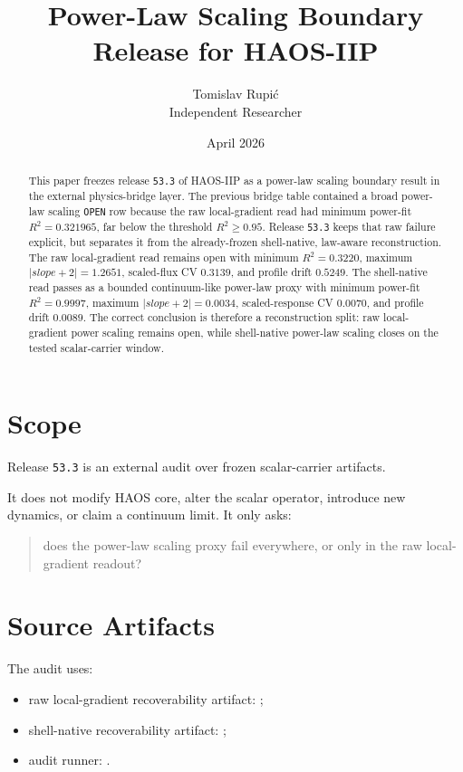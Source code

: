 \documentclass[11pt]{article}
\title{Power-Law Scaling Boundary Release for HAOS-IIP}
\author{Tomislav Rupi\'c \\ Independent Researcher}
\date{April 2026}
\begin{document}
\maketitle

\begin{abstract}
This paper freezes release \texttt{53.3} of HAOS-IIP as a power-law scaling boundary result in the external physics-bridge layer. The previous bridge table contained a broad power-law scaling \texttt{OPEN} row because the raw local-gradient read had minimum power-fit \(R^2 = 0.321965\), far below the threshold \(R^2 \geq 0.95\). Release \texttt{53.3} keeps that raw failure explicit, but separates it from the already-frozen shell-native, law-aware reconstruction. The raw local-gradient read remains open with minimum \(R^2 = 0.3220\), maximum \(|slope+2| = 1.2651\), scaled-flux CV \(0.3139\), and profile drift \(0.5249\). The shell-native read passes as a bounded continuum-like power-law proxy with minimum power-fit \(R^2 = 0.9997\), maximum \(|slope+2| = 0.0034\), scaled-response CV \(0.0070\), and profile drift \(0.0089\). The correct conclusion is therefore a reconstruction split: raw local-gradient power scaling remains open, while shell-native power-law scaling closes on the tested scalar-carrier window.
\end{abstract}

\tableofcontents

\section{Scope}

Release \texttt{53.3} is an external audit over frozen scalar-carrier artifacts.

It does not modify HAOS core, alter the scalar operator, introduce new dynamics, or claim a continuum limit. It only asks:
\begin{quote}
does the power-law scaling proxy fail everywhere, or only in the raw local-gradient readout?
\end{quote}

\section{Source Artifacts}

The audit uses:
\begin{itemize}
\item raw local-gradient recoverability artifact: ;
\item shell-native recoverability artifact: ;
\item audit runner: .
\end{itemize}
\end{document}

